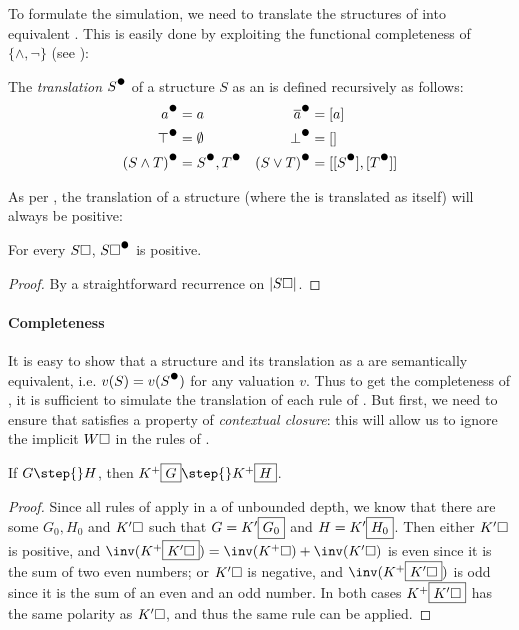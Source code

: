 \begin{scope}
To formulate the simulation, we need to translate the structures of 
into equivalent . This is easily done by exploiting the
functional completeness of $\{\land, \neg\}$ (see ):

\begin{definition}
  The \emph{translation} $\strans{S}$ of a structure $S$ as an  is
  defined recursively as follows:
  \begin{align*}
    \strans{a} &= a & \strans{\dmdual{a}} &= [a] \\
    \strans{\top} &= \emptyset & \strans{\bot} &= [] \\
    \strans{(S \land T)} &= \strans{S}, \strans{T} & \strans{(S \lor T)} &= [[\strans{S}], [\strans{T}]]
  \end{align*}
\end{definition}

As per , the translation of a structure  (where
the  is translated as itself) will always be positive:

\begin{fact}
  For every  $S\square$, $\strans{S\hole}$ is positive.
\end{fact}
\begin{proof}
  By a straightforward recurrence on $\left|S\square\right|$.
\end{proof}

\paragraph{Completeness}

It is easy to show that a structure and its translation as a  are
semantically equivalent, i.e. $v(S) = v(\strans{S})$ for any valuation $v$. Thus
to get the completeness of , it is sufficient to simulate the
translation of each rule of . But first, we need to ensure that
 satisfies a property of \emph{contextual closure}: this will allow
us to ignore the implicit  $W\square$ in the rules of .

\begin{lemma}
  If $G \step{} H$, then $K^+\select{G} \step{} K^+\select{H}$.
\end{lemma}
\begin{proof}
  Since all rules of  apply in a  of unbounded depth, we know
  that there are some  $G_0, H_0$ and  $K'\square$ such that $G =
  K'\fbox{$G_0$}$ and $H = K'\fbox{$H_0$}$. Then either $K'\square$ is positive,
  and $\inv(K^+\select{K'\hole}) = \inv(K^+\hole) + \inv(K'\hole)$ is even since
  it is the sum of two even numbers; or $K'\square$ is negative, and
  $\inv(K^+\select{K'\hole})$ is odd since it is the sum of an even and an odd
  number. In both cases $K^+\fbox{$K'\square$}$ has the same polarity as
  $K'\square$, and thus the same rule can be applied.
\end{proof}


\end{scope}
